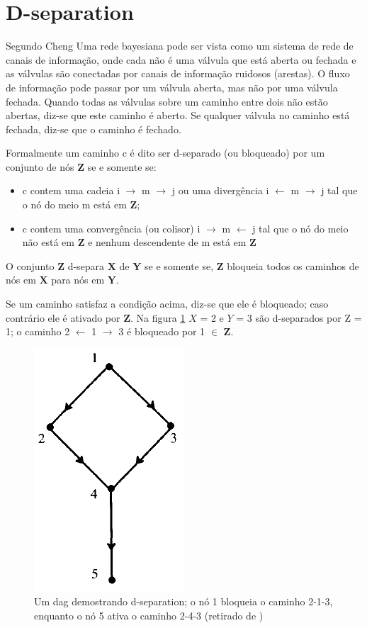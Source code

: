 \section{D-separation}
Segundo Cheng\cite{cheng02} Uma rede bayesiana pode ser vista como um sistema de rede de canais de informação, onde cada não é uma válvula que está aberta ou fechada e as válvulas são conectadas por canais de informação ruidosos (arestas). O fluxo de informação pode passar por um válvula aberta, mas não por uma válvula fechada. Quando todas as válvulas sobre um caminho entre dois não estão abertas, diz-se que este caminho é aberto. Se qualquer válvula no caminho está fechada, diz-se que o caminho é fechado.

Formalmente um caminho c é dito ser d-separado (ou bloqueado) por um conjunto de nós \textbf{Z} se e somente se:
\begin{itemize}
	\item c contem uma cadeia i $\rightarrow$ m $\rightarrow$ j ou uma divergência i $\leftarrow$ m $\rightarrow$ j tal que o nó do meio m está em \textbf{Z};
	\item c contem uma convergência (ou colisor) i $\rightarrow$ m $\leftarrow$ j tal que o nó do meio não está em $\textbf{Z}$ e nenhum descendente de m está em $\textbf{Z}$
\end{itemize}

O conjunto \textbf{Z} d-separa \textbf{X} de \textbf{Y} se e somente se, \textbf{Z} bloqueia todos os caminhos de nós em \textbf{X} para nós em \textbf{Y}.

Se um caminho satisfaz a condição acima, diz-se que ele é bloqueado; caso contrário ele é ativado por \textbf{Z}. Na figura \ref{fig:d-sep} $X$ = {2} e $Y$ = {3} são d-separados por Z = {1}; o caminho 2 $\leftarrow$ 1 $\rightarrow$ 3 é bloqueado por 1 $\in$ \textbf{Z}.
\begin{figure}[H]
	\centering
	\includegraphics{figuras/d-separation}
	\caption[Exemplo D-separation]{Um \gls{dag} demostrando d-separation; o nó 1 bloqueia o caminho 2-1-3, enquanto o nó 5 ativa o caminho 2-4-3 (retirado de \cite{pearl88})}
	\label{fig:d-sep}
\end{figure}

